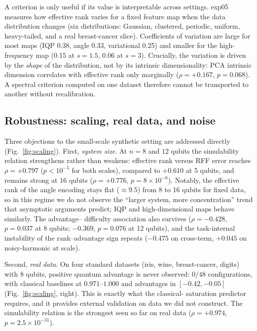 \documentclass[aps,pra,preprint]{revtex4-2}
\begin{document}
A criterion is only useful if its value is interpretable across settings. exp05 measures
how effective rank varies for a fixed feature map when the data distribution changes
(six distributions: Gaussian, clustered, periodic, uniform, heavy-tailed, and a real
breast-cancer slice). Coefficients of variation are large for most maps (IQP 0.38,
angle 0.33, variational 0.25) and smaller for the high-frequency map (0.15 at $s=1.5$,
0.06 at $s=3$). Crucially, the variation is driven by the \emph{shape} of the
distribution, not by its intrinsic dimensionality: PCA intrinsic dimension correlates
with effective rank only marginally ($\rho=+0.167$, $p=0.068$). A spectral criterion
computed on one dataset therefore cannot be transported to another without recalibration.

\subsection{Robustness: scaling, real data, and noise}
\label{sec:robustness}

Three objections to the small-scale synthetic setting are addressed directly (Fig.~\ref{fig:scaling}).
First, \emph{system size}. At $n=8$ and $12$ qubits the simulability relation strengthens
rather than weakens: effective rank versus RFF error reaches $\rho=+0.797$ ($p<10^{-5}$
for both scales), compared to $+0.610$ at 5 qubits, and remains strong at $16$ qubits
($\rho=+0.776$, $p=8\times10^{-6}$). Notably, the effective rank of the
angle encoding stays flat ($\approx9.5$) from 8 to 16 qubits for fixed data, so in this
regime we do not observe the ``larger system, more concentration'' trend that asymptotic
arguments predict; IQP and high-dimensional maps behave similarly. The advantage--
difficulty association also survives ($\rho=-0.428$, $p=0.037$ at 8 qubits; $-0.369$,
$p=0.076$ at 12 qubits), and the task-internal instability of the rank--advantage sign
repeats ($-0.475$ on cross-term, $+0.045$ on noisy-harmonic at scale).

Second, \emph{real data}. On four standard datasets (iris, wine, breast-cancer,
digits) with 8 qubits, positive quantum advantage is never observed: $0/48$
configurations, with classical baselines at $0.971$--$1.000$ and advantages in
$[-0.42,-0.05]$ (Fig.~\ref{fig:scaling}, right). This is exactly what the classical-
saturation predictor requires, and it provides external validation on data we did not
construct. The simulability relation is the strongest seen so far on real data
($\rho=+0.974$, $p=2.5\times10^{-31}$).
\end{document}
